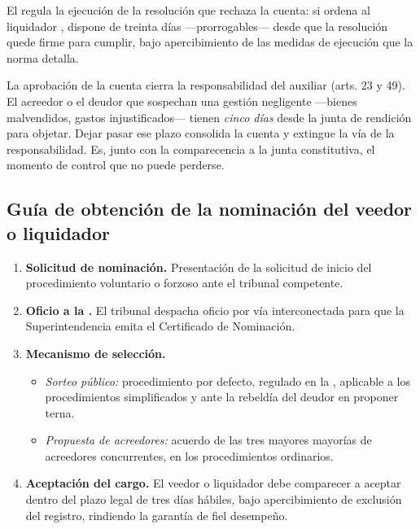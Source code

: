 El  regula la ejecución de la resolución que rechaza la cuenta: si ordena al liquidador
, dispone de treinta días ---prorrogables--- desde que la
resolución quede firme para cumplir, bajo apercibimiento de las medidas de ejecución que la
norma detalla.

\begin{foco}
La aprobación de la cuenta cierra la responsabilidad del auxiliar (arts. 23 y 49). El acreedor o
el deudor que sospechan una gestión negligente ---bienes malvendidos, gastos injustificados---
tienen \emph{cinco días} desde la junta de rendición para objetar. Dejar pasar ese plazo
consolida la cuenta y extingue la vía de la responsabilidad. Es, junto con la comparecencia a la
junta constitutiva, el momento de control que no puede perderse.
\end{foco}

\bloquePractico

\subsection{Guía de obtención de la nominación del veedor o liquidador}

\begin{enumerate}
  \item \textbf{Solicitud de nominación.} Presentación de la solicitud de inicio del
  procedimiento voluntario o forzoso ante el tribunal competente.

  \item \textbf{Oficio a la \superir{}.} El tribunal despacha oficio por vía
  interconectada para que la Superintendencia emita el Certificado de Nominación.

  \item \textbf{Mecanismo de selección.}
  \begin{itemize}
    \item \emph{Sorteo público:} procedimiento por defecto, regulado en la  \citeyearpar{ncg-17},
    aplicable a los procedimientos simplificados y ante la rebeldía del deudor en
    proponer terna.
    \item \emph{Propuesta de acreedores:} acuerdo de las tres mayores mayorías de
    acreedores concurrentes, en los procedimientos ordinarios.
  \end{itemize}

  \item \textbf{Aceptación del cargo.} El veedor o liquidador debe comparecer a aceptar
  dentro del plazo legal de tres días hábiles, bajo apercibimiento de exclusión del
  registro, rindiendo la garantía de fiel desempeño.
\end{enumerate}

